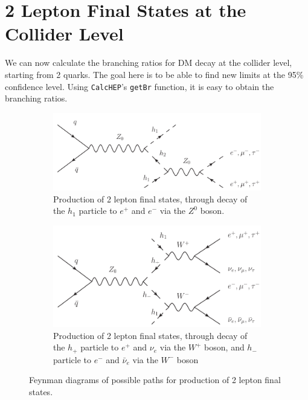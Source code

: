 \documentclass[12pt]{article}
\begin{document}
\section{2 Lepton Final States at the Collider Level}
We can now calculate the branching ratios for DM decay at the collider level, starting from 2 quarks. The goal here is to be able to find new limits at the 95\% confidence level. Using \verb|CalcHEP|'s \verb|getBr| function, it is easy to obtain the branching ratios. 
\begin{figure}[h]
    \centering
    \begin{subfigure}[b]{0.49\textwidth}
        \centering
        \includegraphics[width=\textwidth]{Feynmann_Diagrams/pp-h1h2.pdf}
        \caption{Production of 2 lepton final states, through decay of the $h_1$ particle to $e^+$ and $e^-$ via the $Z^0$ boson.}
        \label{fig:decay_h2}
    \end{subfigure}
    \hfill
    \begin{subfigure}[b]{0.49\textwidth}
        \centering
        \includegraphics[width=\textwidth]{Feynmann_Diagrams/pp-h+h-.pdf}
        \caption{Production of 2 lepton final states, through decay of the $h_+$ particle to $e^+$ and $\nu_e$ via the $W^+$ boson, and $h_-$ particle to $e^-$ and $\bar{\nu}_e$ via the $W^-$ boson}
        \label{fig:decay_h+}
    \end{subfigure}
    \caption{Feynman diagrams of possible paths for production of 2 lepton final states.}
\end{figure}
\end{document}
